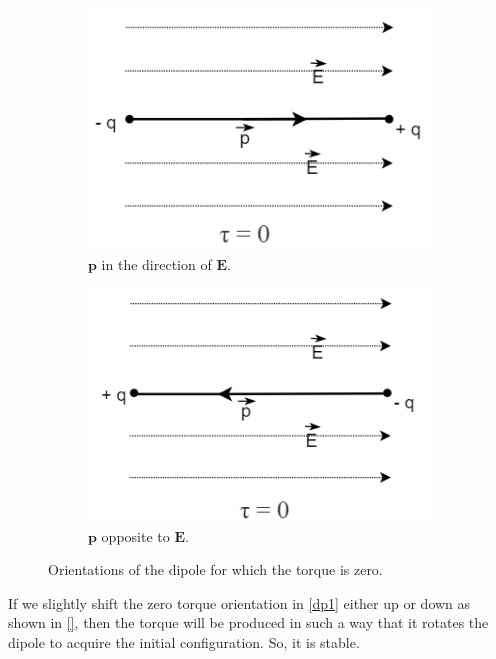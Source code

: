 \begin{figure}[h]
    \centering
    \begin{subfigure}[b]{0.45\textwidth}
    \centering
    \includegraphics[scale = 0.6]{figures/Sandesh's Figures/dipoles1.png}
     \caption{$\bm{p}$ in the direction of $\bm{E}$.}
     \label{dp}
    \end{subfigure}
    \hfill
     \begin{subfigure}[b]{0.45\textwidth}
     \centering
    \includegraphics[scale = 0.6]{figures/Sandesh's Figures/dipoles2.png}
     \caption{$\bm{p}$ opposite to $\bm{E}$.}
     \label{dp}
    \end{subfigure}
    \caption{Orientations of the dipole for which the torque is zero.}
    \label{dipoles}
\end{figure}

If we slightly shift the zero torque orientation in \ref{dp1} either up or down as shown in \ref{}, then the torque will be produced in such a way that it rotates the dipole to acquire the initial configuration. So, it is stable.\\

